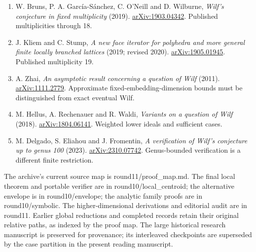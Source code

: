 \documentclass[
  11pt,
  a4paper,
]{article}
\providecommand{\tightlist}{%
  \setlength{\itemsep}{0pt}\setlength{\parskip}{0pt}}
\begin{document}
\begin{enumerate}
\def\labelenumi{\arabic{enumi}.}
\tightlist
\item
  W. Bruns, P. A. García-Sánchez, C. O'Neill and D. Wilburne,
  \emph{Wilf's conjecture in fixed multiplicity} (2019).
  \href{https://arxiv.org/abs/1903.04342}{arXiv:1903.04342}. Published
  multiplicities through 18.
\item
  J. Kliem and C. Stump, \emph{A new face iterator for polyhedra and
  more general finite locally branched lattices} (2019; revised 2020).
  \href{https://arxiv.org/abs/1905.01945}{arXiv:1905.01945}. Published
  multiplicity 19.
\item
  A. Zhai, \emph{An asymptotic result concerning a question of Wilf}
  (2011). \href{https://arxiv.org/abs/1111.2779}{arXiv:1111.2779}.
  Approximate fixed-embedding-dimension bounds must be distinguished
  from exact eventual Wilf.
\item
  M. Hellus, A. Rechenauer and R. Waldi, \emph{Variants on a question of
  Wilf} (2018).
  \href{https://arxiv.org/abs/1804.06141}{arXiv:1804.06141}. Weighted
  lower ideals and sufficient cases.
\item
  M. Delgado, S. Eliahou and J. Fromentin, \emph{A verification of
  Wilf's conjecture up to genus 100} (2023).
  \href{https://arxiv.org/abs/2310.07742}{arXiv:2310.07742}.
  Genus-bounded verification is a different finite restriction.
\end{enumerate}

The archive's current source map is round11/proof\_map.md. The final
local theorem and portable verifier are in round10/local\_centroid; the
alternative envelope is in round10/envelope; the analytic family proofs
are in round10/symbolic. The higher-dimensional derivations and
editorial audit are in round11. Earlier global reductions and completed
records retain their original relative paths, as indexed by the proof
map. The large historical research manuscript is preserved for
provenance; its interleaved checkpoints are superseded by the case
partition in the present reading manuscript.
\end{document}
